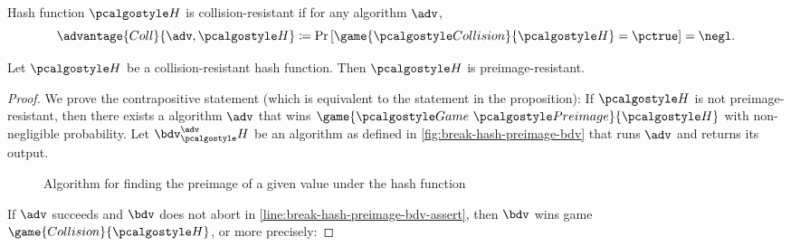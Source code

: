 \begin{definition}
  Hash function $\algo{H}$ is collision-resistant if for any \ppt algorithm $\adv$,
 \[
  \advantage{Coll}{\adv, \algo{H}} \defeq \pr{\game{\algo{Collision}}{\algo{H}} = \pctrue} = \negl.
 \]
\end{definition}

\begin{theorem}
  Let $\algo{H}$ be a collision-resistant hash function. Then $\algo{H}$ is preimage-resistant.
\end{theorem}
\begin{proof}
  We prove the contrapositive statement (which is equivalent to the statement in the proposition):
  If $\algo{H}$ is not preimage-resistant, then there exists a \ppt algorithm $\adv$ that wins $\game{\Game~\algo{Preimage}}{\algo{H}}$ with non-negligible probability.
  Let $\bdv^\adv_\algo{H}$ be an algorithm as defined in \autoref{fig:break-hash-preimage-bdv} that runs $\adv$ and returns its output.
  \begin{figure}[tbhp]
  \begin{center}
    \begin{tcolorbox}[width=4cm]
      \begin{pchstack}[center]
      \end{pchstack}
    \end{tcolorbox}
  \end{center}
  \caption{Algorithm for finding the preimage of a given value under the hash function \label{fig:break-hash-preimage-bdv}}
  \end{figure}
  If $\adv$ succeeds and $\bdv$ does not abort in \cref{line:break-hash-preimage-bdv-assert}, then $\bdv$ wins game $\game{Collision}{\algo{H}}$, or more precisely:


\end{proof}

